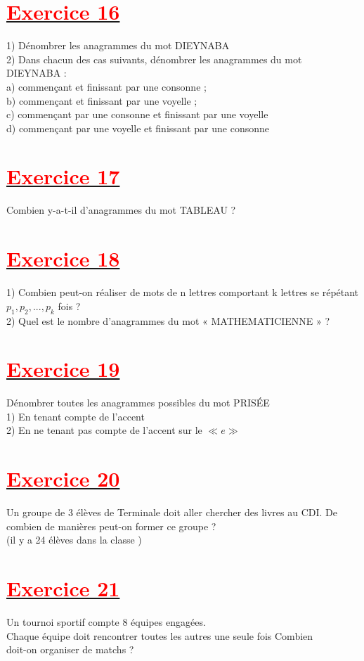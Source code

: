 \documentclass[12pt]{article}
\begin{document}
\section*{\underline{\textbf{\textcolor{red}{Exercice 16}}}}
1) Dénombrer les anagrammes du mot DIEYNABA\\
2) Dans chacun des cas suivants, dénombrer les anagrammes du mot \\DIEYNABA :\\
a) commençant et finissant par une consonne ;\\
b) commençant et finissant par une voyelle ;\\
c) commençant par une consonne et finissant par une voyelle\\
d) commençant par une voyelle et finissant par une consonne\\
\section*{\underline{\textbf{\textcolor{red}{Exercice 17}}}}
Combien y-a-t-il d’anagrammes du mot TABLEAU ?
\section*{\underline{\textbf{\textcolor{red}{Exercice 18}}}}
1) Combien peut-on réaliser de mots de n lettres comportant k lettres se répétant $p_{1} ,p_{2},...,p_{k}$ fois ?\\
2) Quel est le nombre d’anagrammes du mot « MATHEMATICIENNE » ?
\section*{\underline{\textbf{\textcolor{red}{Exercice 19}}}}
Dénombrer toutes les anagrammes possibles du mot PRISÉE\\
1) En tenant compte de l’accent\\
2) En ne tenant pas compte de l’accent sur le $\ll e \gg$ 
\section*{\underline{\textbf{\textcolor{red}{Exercice 20}}}}
Un groupe de 3 élèves de Terminale doit aller chercher des livres au CDI. De combien de manières peut-on former ce groupe ?\\ (il y a 24 élèves dans la classe )
\section*{\underline{\textbf{\textcolor{red}{Exercice 21}}}}
Un tournoi sportif compte 8 équipes engagées. \\Chaque équipe doit rencontrer toutes les autres une seule fois Combien\\ doit-on organiser de matchs ?
\end{document}
